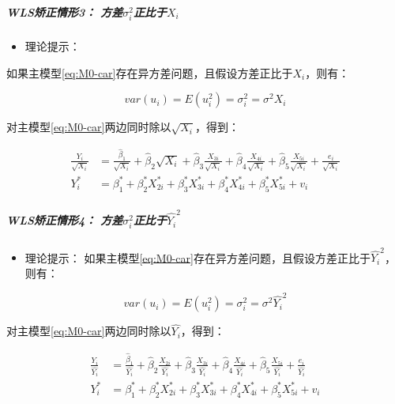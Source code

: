 \documentclass[12pt,(landscape,a4paper),(portrait,a4paper)]{article}
\providecommand{\tightlist}{%
  \setlength{\itemsep}{0pt}\setlength{\parskip}{0pt}}
\let\oldsubparagraph\subparagraph
\renewcommand{\subparagraph}[1]{\oldsubparagraph{#1}\mbox{}}
\begin{document}
\hypertarget{wls3-sigma2_ix_i}{%
\subparagraph{\texorpdfstring{WLS矫正情形3：
方差\(\sigma^2_i\)正比于\(X_i\)}{WLS矫正情形3： 方差\textbackslash{}sigma\^{}2\_i正比于X\_i}}\label{wls3-sigma2_ix_i}}

\begin{itemize}
\tightlist
\item
  理论提示：
\end{itemize}

如果主模型\eqref{eq:M0-car}存在异方差问题，且假设方差正比于\(X_i\)，则有：

\begin{equation}
var(u_i)=E(u^2_i)=\sigma^2_i=\sigma^2X_i \label{eq:WLS-X}
\end{equation}

对主模型\eqref{eq:M0-car}两边同时除以\(\sqrt{X_i}\)，得到：

\begin{align}
\frac{Y_i}{\sqrt{X_i}} &=\frac{\hat{\beta}_1}{\sqrt{X_i}}+\hat{\beta}_2\sqrt{X_i}+\hat{\beta}_3\frac{X_{3i}}{\sqrt{X_i}}+\hat{\beta}_4\frac{X_{4i}}{\sqrt{X_i}}+\hat{\beta}_5\frac{X_{5i}}{\sqrt{X_i}}+\frac{e_{i}}{\sqrt{X_i}}\label{eq:WLS1-adj}\\
Y^{\ast}_i &=\beta^{\ast}_1+\beta^{\ast}_2X^{\ast}_{2i}+\beta^{\ast}_3X^{\ast}_{3i}+\beta^{\ast}_4X^{\ast}_{4i}+\beta^{\ast}_5X^{\ast}_{5i}+v_{i} \label{eq:WLS1-red}
\end{align}

\hypertarget{wls4-sigma2_ihaty_i2}{%
\subparagraph{\texorpdfstring{WLS矫正情形4：
方差\(\sigma^2_i\)正比于\(\hat{Y_i}^2\)}{WLS矫正情形4： 方差\textbackslash{}sigma\^{}2\_i正比于\textbackslash{}hat\{Y\_i\}\^{}2}}\label{wls4-sigma2_ihaty_i2}}

\begin{itemize}
\tightlist
\item
  理论提示：
  如果主模型\eqref{eq:M0-car}存在异方差问题，且假设方差正比于\(\hat{Y_i}^2\)，则有：
\end{itemize}

\begin{equation}
var(u_i)=E(u^2_i)=\sigma^2_i=\sigma^2\hat{Y_i}^2 \label{eq:WLS-Y2}
\end{equation}

对主模型\eqref{eq:M0-car}两边同时除以\(\hat{Y_i}\)，得到：

\begin{align}
\frac{Y_i}{\hat{Y_i}} &=\frac{\hat{\beta}_1}{\hat{Y_i}}+\hat{\beta}_2\frac{X_{2i}}{\hat{Y_i}}+\hat{\beta}_3\frac{X_{3i}}{\hat{Y_i}}+\hat{\beta}_4\frac{X_{4i}}{\hat{Y_i}}+\hat{\beta}_5\frac{X_{5i}}{\hat{Y_i}}+\frac{e_{i}}{\hat{Y_i}}\label{eq:WLS-Y2-adj}\\
Y^{\ast}_i &=\beta^{\ast}_1+\beta^{\ast}_2X^{\ast}_{2i}+\beta^{\ast}_3X^{\ast}_{3i}+\beta^{\ast}_4X^{\ast}_{4i}+\beta^{\ast}_5X^{\ast}_{5i}+v_{i} \label{eq:WLS1-Y2-red}
\end{align}
\end{document}
